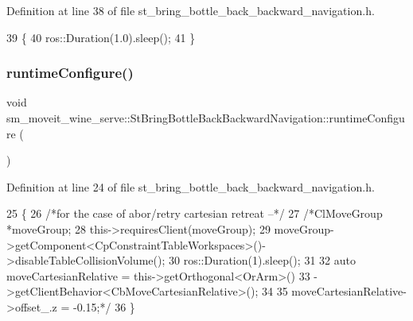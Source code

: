 Definition at line 38 of file st\+\_\+bring\+\_\+bottle\+\_\+back\+\_\+backward\+\_\+navigation.\+h.


\begin{DoxyCode}
39         \{
40             ros::Duration(1.0).sleep();
41         \}
\end{DoxyCode}
\mbox{\label{structsm__moveit__wine__serve_1_1StBringBottleBackBackwardNavigation_acf2093f3381d539603ad50356d7ce4ce}} 
\subsubsection{\texorpdfstring{runtime\+Configure()}{runtimeConfigure()}}
{\footnotesize\ttfamily void sm\+\_\+moveit\+\_\+wine\+\_\+serve\+::\+St\+Bring\+Bottle\+Back\+Backward\+Navigation\+::runtime\+Configure (\begin{DoxyParamCaption}{ }\end{DoxyParamCaption})\hspace{0.3cm}{\ttfamily [inline]}}



Definition at line 24 of file st\+\_\+bring\+\_\+bottle\+\_\+back\+\_\+backward\+\_\+navigation.\+h.


\begin{DoxyCode}
25         \{
26             \textcolor{comment}{/*for the case of abor/retry cartesian retreat --*/}
27             \textcolor{comment}{/*ClMoveGroup *moveGroup;}
28 \textcolor{comment}{            this->requiresClient(moveGroup);}
29 \textcolor{comment}{            moveGroup->getComponent<CpConstraintTableWorkspaces>()->disableTableCollisionVolume();}
30 \textcolor{comment}{            ros::Duration(1).sleep();}
31 \textcolor{comment}{}
32 \textcolor{comment}{            auto moveCartesianRelative = this->getOrthogonal<OrArm>()}
33 \textcolor{comment}{                                             ->getClientBehavior<CbMoveCartesianRelative>();}
34 \textcolor{comment}{}
35 \textcolor{comment}{            moveCartesianRelative->offset\_.z = -0.15;*/}
36         \}
\end{DoxyCode}
\mbox{\label{structsm__moveit__wine__serve_1_1StBringBottleBackBackwardNavigation_a180622c1b6eea42a42e8e85ae3b110db}} 
